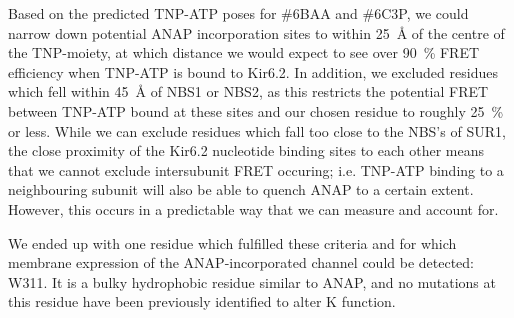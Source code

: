 Based on the predicted TNP-ATP poses for \#6BAA and \#6C3P, we could narrow down potential ANAP incorporation sites to within \SI{25}{\angstrom} of the centre of the TNP-moiety, at which distance we would expect to see over \SI{90}{\percent} FRET efficiency when TNP-ATP is bound to Kir6.2.
In addition, we excluded residues which fell within \SI{45}{\angstrom} of NBS1 or NBS2, as this restricts the potential FRET between TNP-ATP bound at these sites and our chosen residue to roughly \SI{25}{\percent} or less.
While we can exclude residues which fall too close to the NBS's of SUR1, the close proximity of the Kir6.2 nucleotide binding sites to each other means that we cannot exclude intersubunit FRET occuring; i.e. TNP-ATP binding to a neighbouring subunit will also be able to quench ANAP to a certain extent. However, this occurs in a predictable way that we can measure and account for.

We ended up with one residue which fulfilled these criteria and for which membrane expression of the ANAP-incorporated channel could be detected: W311.
It is a bulky hydrophobic residue similar to ANAP, and no mutations at this residue have been previously identified to alter K\ATP{} function.

